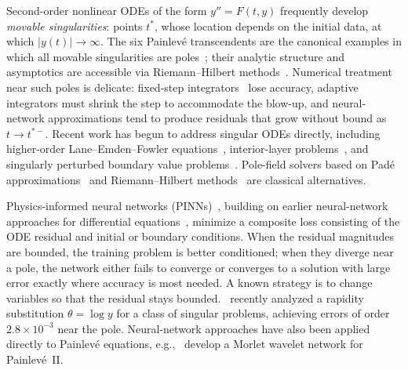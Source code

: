 \documentclass[11pt,a4paper]{article}
\theoremstyle{definition}
\begin{document}
Second-order nonlinear ODEs of the form $y'' = F(t, y)$ frequently
develop \emph{movable singularities}: points $t^*$, whose location
depends on the initial data, at which $|y(t)| \to \infty$.
The six Painlev\'e transcendents are the canonical examples in which
all movable singularities are poles~\cite{Ince1956,Gromak2002,Conte2008,Clarkson2003};
their analytic structure and asymptotics are accessible via
Riemann--Hilbert methods~\cite{Deift1995,Fokas2006}.
Numerical treatment near such poles is delicate: fixed-step integrators~\cite{Butcher2016,Hairer1993}
lose accuracy, adaptive integrators must shrink the step to
accommodate the blow-up, and neural-network approximations tend to
produce residuals that grow without bound as $t \to t^{*-}$. Recent work has begun to address singular ODEs directly, including higher-order Lane--Emden--Fowler equations~\cite{Baty2023}, interior-layer problems~\cite{Chang2024}, and singularly perturbed boundary value problems~\cite{Israr2025}. Pole-field solvers based on Pad{\'e} approximations~\cite{Fornberg2011} and Riemann--Hilbert methods~\cite{DLMF32} are classical alternatives.

Physics-informed neural networks (PINNs)~\cite{Raissi2019,Karniadakis2021,Cuomo2022},
building on earlier neural-network approaches for differential equations~\cite{Lagaris1998,Sirignano2018}, minimize a
composite loss consisting of the ODE residual and initial or boundary
conditions. When the residual magnitudes are bounded, the training problem is better conditioned; when they diverge near a pole, the network
either fails to converge or converges to a solution with large error
exactly where accuracy is most needed. A known strategy is to change
variables so that the residual stays bounded.~\citet{Cayuso2025}
recently analyzed a rapidity substitution $\theta = \log y$ for a class
of singular problems, achieving errors of order $2.8 \times 10^{-3}$
near the pole. Neural-network approaches have also been applied directly to Painlev\'e equations, e.g.,~\citet{Faisal2025} develop a Morlet wavelet network for Painlev\'e~II.
\end{document}
